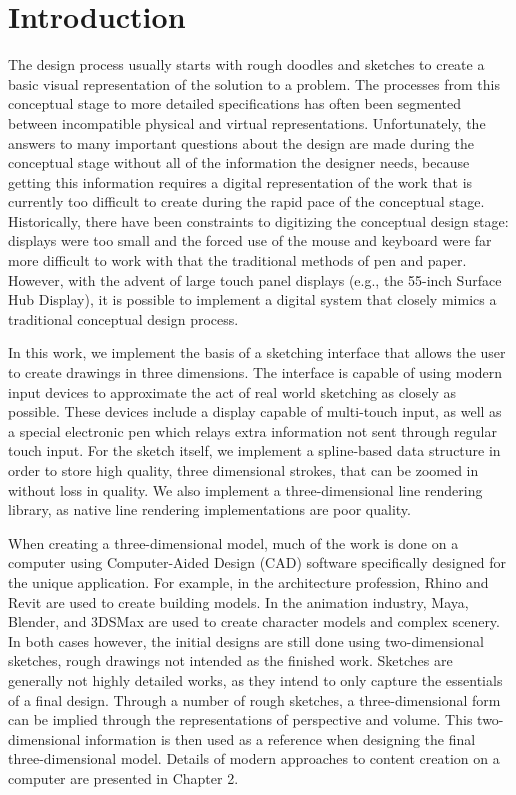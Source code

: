 \chapter{Introduction}

The design process usually starts with rough doodles and sketches to create a basic visual representation of the solution to a problem.
The processes from this conceptual stage to more detailed specifications has often been segmented between incompatible physical and virtual representations.
Unfortunately, the answers to many important questions about the design are made during the conceptual stage without all of the information the designer needs, because getting this information requires a digital representation of the work that is currently too difficult to create during the rapid pace of the conceptual stage.
Historically, there have been constraints to digitizing the conceptual design stage: displays were too small and the forced use of the mouse and keyboard were far more difficult to work with that the traditional methods of pen and paper.
However, with the advent of large touch panel displays (e.g., the 55-inch Surface Hub Display), it is possible to implement a digital system that closely mimics a traditional conceptual design process.

In this work, we implement the basis of a sketching interface that allows the user to create drawings in three dimensions.
The interface is capable of using modern input devices to approximate the act of real world sketching as closely as possible.
These devices include a display capable of multi-touch input, as well as a special electronic pen which relays extra information
not sent through regular touch input.
For the sketch itself, we implement a spline-based data structure in order to store high quality, three dimensional strokes, that can be zoomed in without loss in quality.
We also implement a three-dimensional line rendering library, as native line rendering implementations are poor quality.

When creating a three-dimensional model, much of the work is done on a computer using Computer-Aided Design (CAD) software specifically designed for the unique application.
For example, in the architecture profession, Rhino and Revit are used to create building models.
In the animation industry, Maya, Blender, and 3DSMax are used to create character models and complex scenery.
In both cases however, the initial designs are still done using two-dimensional sketches, rough drawings not intended as the finished work.
Sketches are generally not highly detailed works, as they intend to only capture the essentials of a final design.
Through a number of rough sketches, a three-dimensional form can be implied through the representations of perspective and volume.
This two-dimensional information is then used as a reference when designing the final three-dimensional model.
Details of modern approaches to content creation on a computer are presented in Chapter 2.

